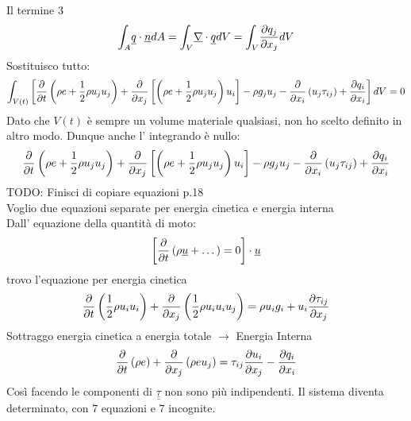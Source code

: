 Il termine 3
\[
\displaystyle{\int_{A}^{}}\underline{q}\cdot \underline{n}dA = \displaystyle{\int_{V}^{}}\underline{\nabla}\cdot \underline{q}dV = \displaystyle{\int_{V}^{}}\frac{\partial q_j}{\partial x_j}dV
\]
Sostituisco tutto:
\[
\displaystyle{\int_{V\left( t\right) }^{}}\left[ \frac{\partial}{\partial t}\left( \rho e+\frac{1}{2}\rho u_ju_j\right) +\frac{\partial}{\partial x_j}\left[ \left( \rho e +\frac{1}{2}\rho u_ju_j\right) u_i\right]-\rho g_ju_j-\frac{\partial}{\partial x_i}\left( u_j\tau_{ij}\right) +\frac{\partial q_i}{\partial x_i}\right]dV =0  
\]
Dato che $ V\left( t\right)  $ è sempre un volume materiale qualsiasi, non ho scelto definito in altro modo. Dunque anche l' integrando è nullo:
\[
\frac{\partial}{\partial t}\left( \rho e+\frac{1}{2}\rho u_ju_j\right) +\frac{\partial}{\partial x_j}\left[ \left( \rho e + \frac{1}{2}\rho u_ju_j\right) u_i\right] -\rho g_ju_j-\frac{\partial}{\partial x_i}\left( u_j\tau_{ij}\right) +\frac{\partial q_i}{\partial x_i}
\]
TODO: Finisci di copiare equazioni p.18\\
Voglio due equazioni separate per energia cinetica e energia interna\\
Dall' equazione della quantità di moto:
\[
\left[ \frac{\partial}{\partial t}\left( \rho \underline{u}+\dots \right) =0\right] \cdot \underline{u}  
\]
trovo l'equazione per energia cinetica
\begin{equation}
  \frac{\partial}{\partial t}\left( \frac{1}{2}\rho u_iu_i\right) +\frac{\partial}{\partial x_j}\left( \frac{1}{2}\rho u_iu_iu_j\right) =\rho u_ig_i+u_i\frac{\partial\tau_{ij}}{\partial x_j}
\end{equation}
Sottraggo energia cinetica a energia totale $ \rightarrow  $ Energia Interna
\[
\frac{\partial}{\partial t}\left( \rho e\right) +\frac{\partial}{\partial x_j}\left( \rho eu_j\right) =\tau_{ij} \frac{\partial u_i}{\partial x_j}-\frac{\partial q_i}{\partial x_i}
\]
Così facendo le componenti di $ \underline{\underline{\tau}} $ non sono più indipendenti. Il sistema diventa determinato, con $ 7 $ equazioni e $ 7 $ incognite.

